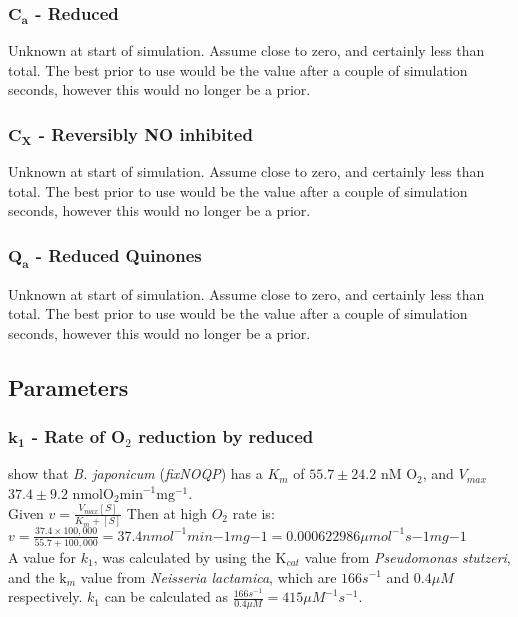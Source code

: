 \subsubsection*{$\mathbf{C_a}$ {\bf- Reduced \cbbthree{}}}
Unknown at start of simulation. Assume close to zero, and certainly less than total. The best prior to use would be the value after a couple of simulation seconds, however this would no longer be a prior.

\subsubsection*{$\mathbf{C_X}$ {\bf- Reversibly NO inhibited \cbbthree{}}}
Unknown at start of simulation. Assume close to zero, and certainly less than total. The best prior to use would be the value after a couple of simulation seconds, however this would no longer be a prior.

\subsubsection*{$\mathbf{Q_a}$ {\bf- Reduced Quinones}}
Unknown at start of simulation. Assume close to zero, and certainly less than total. The best prior to use would be the value after a couple of simulation seconds, however this would no longer be a prior.

\subsection*{Parameters}
\subsubsection*{$\mathbf{k_1}$ {\bf- Rate of O$_{\textrm{2}}$ reduction by reduced \cbbthree{}}}
\citet{Preisig1996} show that \textit{B. japonicum} \cbbthree{} (\textit{fixNOQP}) has a $K_m$ of $55.7 \pm 24.2$ nM $\mathrm{O}_2$, and $V_{max}$ $37.4 \pm 9.2$ $\mathrm{nmol O}_2 \mathrm{min}^{-1} \mathrm{mg}^{-1}$.\\
Given $v = \frac{V_{max}[S]}{K_m+[S]}$
Then at high $O_2$ rate is:
$v = \frac{37.4\times 100,000}{55.7+100,000} = 37.4nmol^{-1}min{-1}mg{-1} = 0.000622986\mu mol^{-1}s{-1}mg{-1}$\\

A value for $k_1$, was calculated by using the $\mathrm{K}_{cat}$ value from \textit{Pseudomonas stutzeri}\cite{Forte2001}, and the $\textrm{k}_m$ value from \textit{Neisseria lactamica}\cite{Hunter2007}, which are $166s^{-1}$ and $0.4\mu M$ respectively. $k_1$ can be calculated as $\frac{166s^{-1}}{0.4\mu M} = 415\mu M^{-1} s^{-1}$.

